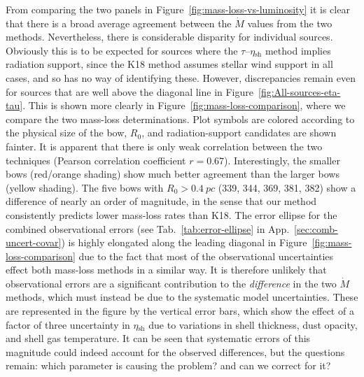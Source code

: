 \documentclass[useAMS, usenatbib, a4paper]{mnras}
\newcommand\shell{\ensuremath{_{\text{sh}}}}
\begin{document}
From comparing the two panels in
Figure~\ref{fig:mass-loss-vs-luminosity} it is clear that there is a
broad average agreement between the \(\dot{M}\) values from the two
methods.  Nevertheless, there is considerable disparity for individual
sources.  Obviously this is to be expected for sources where the
\(\tau\)--\(\eta\shell\) method implies radiation support, since the
K18 method assumes stellar wind support in all cases, and so has no
way of identifying these.  However, discrepancies remain even for
sources that are well above the diagonal line in
Figure~\ref{fig:All-sources-eta-tau}.  This is shown more clearly in
Figure~\ref{fig:mass-loss-comparison}, where we compare the two
mass-loss determinations. Plot symbols are colored according to the
physical size of the bow, \(R_0\), and radiation-support candidates
are shown fainter.  It is apparent that there is only weak correlation
between the two techniques (Pearson correlation coefficient
\(r = 0.67\)).  Interestingly, the smaller bows (red/orange shading)
show much better agreement than the larger bows (yellow shading).  The
five bows with \(R_0 > \SI{0.4}{pc}\) (339, 344, 369, 381, 382) show a
difference of nearly an order of magnitude, in the sense that our
method consistently predicts lower mass-loss rates than K18.  The
error ellipse for the combined observational errors (see
Tab.~\ref{tab:error-ellipse} in App.~\ref{sec:comb-uncert-covar}) is
highly elongated along the leading diagonal in
Figure~\ref{fig:mass-loss-comparison} due to the fact that most of the
observational uncertainties effect both mass-loss methods in a similar
way.  It is therefore unlikely that observational errors are a
significant contribution to the \textit{difference} in the two
\(\dot M\) methods, which must instead be due to the systematic model
uncertainties.  These are represented in the figure by the vertical
error bars, which show the effect of a factor of three uncertainty in
\(\eta\shell\) due to variations in shell thickness, dust opacity, and
shell gas temperature.  It can be seen that systematic errors of this
magnitude could indeed account for the observed differences, but the
questions remain: which parameter is causing the problem? and can we
correct for it?
\end{document}
